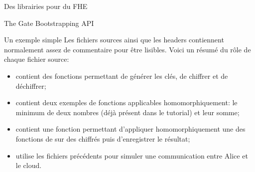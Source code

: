 \begin{section}{Des librairies pour du FHE}
\begin{subsection}{The Gate Bootstrapping API}
\begin{subsubsection}{Un exemple simple}
Les fichiers sources ainsi que les headers contiennent normalement assez de
commentaire pour être lisibles. Voici un résumé du rôle de chaque fichier source:
\begin{itemize}
\item {} contient des fonctions permettant de générer les
clés, de chiffrer et de déchiffrer;
\item {} contient deux exemples de fonctions 
applicables homomorphiquement: le minimum de deux nombres (déjà 
présent dans le tutorial) et leur somme;
\item {} contient une fonction permettant d'appliquer 
homomorphiquement une des fonctions de 
sur des chiffrés puis d'enregistrer le résultat;
\item {} utilise les fichiers précédents
	pour simuler une communication entre Alice et le cloud.
\end{itemize}


	
\end{subsubsection} %
\end{subsection} %
\end{section}
